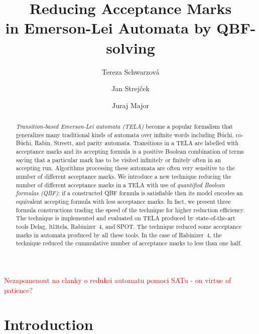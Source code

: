 \documentclass[a4paper,UKenglish,cleveref, autoref, thm-restate]{lipics-v2021}
\title{Reducing Acceptance Marks\\ in Emerson-Lei Automata by QBF-solving}
\author{Tereza Schwarzov\'{a}}{Faculty of Informatics, Masaryk University, Brno, Czech Republic}{xschwar3@mail.muni.cz}{}{}
\author{Jan Strej\v{c}ek}{Faculty of Informatics, Masaryk University, Brno, Czech Republic}{strejcek@fi.muni.cz}{https://orcid.org/0000-0001-5873-403X}{}
\author{Juraj Major}{Faculty of Informatics, Masaryk University, Brno, Czech Republic}{major@fi.muni.cz}{}{}
\newcommand{\todo}[1]{\textcolor{red}{#1}}
\begin{document}
\maketitle


\begin{abstract}
  \emph{Transition-based Emerson-Lei automata (TELA)} become a popular
  formalism that generalizes many traditional kinds of automata over
  infinite words including Büchi, co-Büchi, Rabin, Streett, and parity
  automata. Transitions in a TELA are labelled with acceptance marks
  and its accepting formula is a positive Boolean combination of terms
  saying that a particular mark has to be visited infinitely or
  finitely often in an accepting run. Algorithms processing these
  automata are often very sensitive to the number of different
  acceptance marks. We introduce a new technique reducing the number
  of different acceptance marks in a TELA with use of \emph{quantified
    Boolean formulas (QBF)}: if a constructed QBF formula is
  satisfiable then its model encodes an equivalent accepting formula
  with less acceptance marks. In fact, we present three formula
  constructions trading the speed of the technique for higher
  reduction efficiency. The technique is implemented and evaluated on
  TELA produced by state-of-the-art tools Delag, ltl3tela,
  Rabinizer~4, and SPOT. The technique reduced some acceptance marks
  in automata produced by all these tools. In the case of Rabinizer~4,
  the technique reduced the cummulative number of acceptance marks to
  less than one half. 
\end{abstract}


\todo{Nezapomenout na clanky o redukci automatu pomoci SATu - on virtue of patience?}


\section{Introduction}

\end{document}
